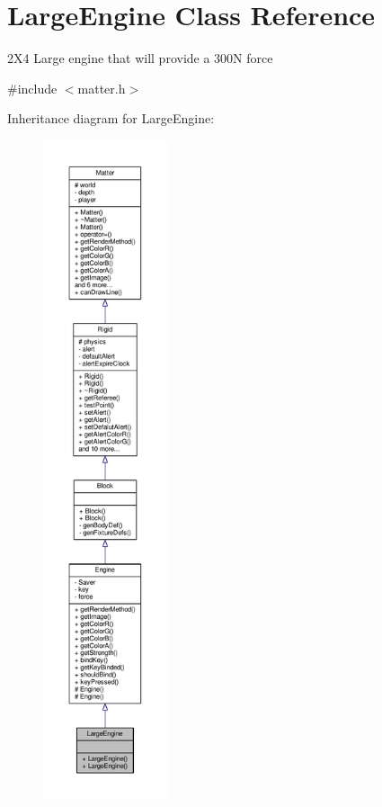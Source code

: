\hypertarget{classLargeEngine}{}\section{Large\+Engine Class Reference}
\label{classLargeEngine}


2\+X4 Large engine that will provide a 300\+N force  




{\ttfamily \#include $<$matter.\+h$>$}



Inheritance diagram for Large\+Engine\+:
\nopagebreak
\begin{figure}[H]
\begin{center}
\leavevmode
\includegraphics[height=550pt]{classLargeEngine__inherit__graph}
\end{center}
\end{figure}



